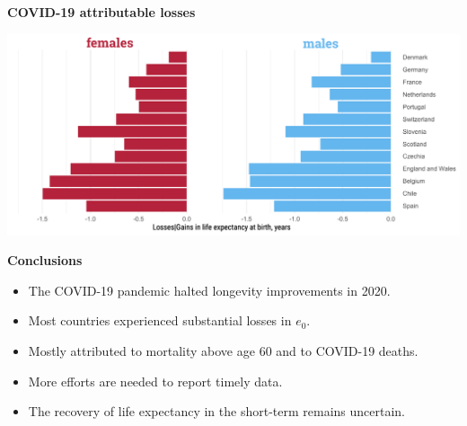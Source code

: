 \documentclass[xcolor={dvipsnames}]{beamer}
\begin{document}
\begin{frame}
\Large{
	\begin{center}
		\textbf{COVID-19 attributable losses}
	\end{center} 
		\hspace*{-1.8cm}   
	\includegraphics[scale=.58]{fig-4}
}
\end{frame}


\begin{frame}
\Large{
	\begin{center}
		\textbf{Conclusions}
	\end{center} 
\begin{itemize}
\item The COVID-19 pandemic halted longevity improvements in 2020. \pause
\item Most countries experienced substantial losses in $e_0$. \pause
\item Mostly attributed to mortality above age 60 and to COVID-19 deaths. \pause
\item More efforts are needed to report timely data. \pause
\item The recovery of life expectancy in the short-term remains uncertain. 

\end{itemize}
}
\end{frame}

	

\end{document}

